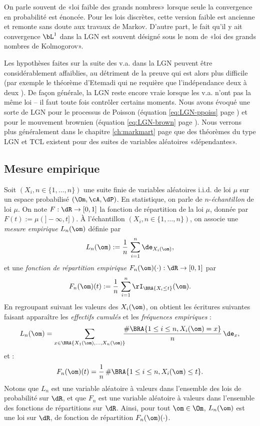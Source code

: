 \begin{remark}
  On parle souvent de «loi faible des grands nombres» lorsque seule la
  convergence en probabilité est énoncée. Pour les lois discrètes, cette
  version faible est ancienne et remonte sans doute aux travaux de Markov.
  D'autre part, le fait qu'il y ait convergence $\bL^1$ dans la LGN est
  souvent désigné sous le nom de «loi des grands nombres de Kolmogorov».
\end{remark}

\begin{remark}
  Les hypothèses faites sur la suite des v.a. dans la LGN peuvent être
  considérablement affaiblies, au détriment de la preuve qui est alors plus
  difficile (par exemple le théorème d'Etemadi qui ne requière que
  l'indépendance deux à deux \cite{borkar}). De façon générale, la LGN reste
  encore vraie lorsque les v.a. n'ont pas la même loi -- il faut toute fois
  contrôler certains moments.  Nous avons évoqué une sorte de LGN pour le
  processus de Poisson (équation \eqref{eq:LGN-ppoiss} page
  \pageref{eq:LGN-ppoiss}) et pour le mouvement brownien (équation
  \eqref{eq:LGN-brown} page \pageref{eq:LGN-brown}).  Nous verrons plus
  généralement dans le chapitre \ref{ch:markmart} page \pageref{ch:markmart}
  que des théorèmes du type LGN et TCL existent pour des suites de variables
  aléatoires «dépendantes».
\end{remark}

%
\subsection{Mesure empirique}
%

Soit $(X_i,n\in\{1,\ldots,n\})$ une suite finie de variables aléatoires i.i.d.
de loi $\mu$ sur un espace probabilisé $(\Om,\cA,\dP)$.  En statistique, on
parle de $n$-\emph{échantillon} de loi $\mu$. On note $F:\dR\to[0,1]$ la
fonction de répartition de la loi $\mu$, donnée par $F(t):=\mu(]-\infty,t])$.
À l'échantillon $(X_i,n\in\{1,\ldots,n\})$, on associe une \emph{mesure
  empirique} $L_n(\om)$ définie par
$$
L_n(\om):=\frac{1}{n}\,\sum_{i=1}^n \de_{X_i(\om)},
$$
et une \emph{fonction de répartition empirique}
$F_n(\om)(\cdot):\dR\to[0,1]$ par
$$
F_n(\om)(t):=\frac{1}{n}\,\sum_{i=1}^n \rI_{\BRA{X_i\leq t}}(\om).
$$
En regroupant suivant les valeurs des $X_i(\om)$, on obtient les écritures
suivantes faisant apparaître les \emph{effectifs cumulés} et les
\emph{fréquences empiriques} :
$$
L_n(\om)
=\sum_{x\in\BRA{X_1(\om),\ldots,X_n(\om)}}
\!\!\!\frac{\#\BRA{1\leq i \leq n, X_i(\om)=x}}{n}\,\de_x,
$$
et :
$$
F_n(\om)(t)=\frac{1}{n}\, \#\BRA{1\leq i \leq n, X_i(\om)\leq t}.
$$
Notons que $L_n$ est une variable aléatoire à valeurs dans l'ensemble des
lois de probabilité sur $\dR$, et que $F_n$ est une variable aléatoire à
valeurs dans l'ensemble des fonctions de répartitions sur $\dR$. Ainsi, pour
tout $\om\in\Om$, $L_n(\om)$ est une loi sur $\dR$, de fonction de répartition
$F_n(\om)(\cdot)$.

